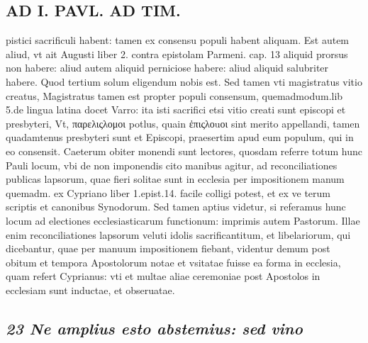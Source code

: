 \documentclass{article}
\begin{document}
\begin{pages}
\section*{AD I. PAVL. AD TIM. }
\marginpar{[ p.320 ]}\pstart pistici sacrificuli habent: tamen ex consensu populi habent aliquam. Est autem aliud, vt ait Augusti liber 2. contra epistolam Parmeni. cap. 13 aliquid prorsus non habere: aliud autem aliquid perniciose habere: aliud aliquid salubriter habere. Quod tertium solum eligendum nobis est. Sed tamen vti magistratus vitio creatus, Magistratus tamen est propter populi consensum, quemadmodum.lib 5.de lingua latina docet Varro: ita isti sacrifici etsi vitio creati sunt episcopi et presbyteri, Vt, παρελιςλομοι potlus, quain ἐπιςλοuοι sint merito appellandi, tamen quadamtenus presbyteri sunt et Episcopi, praesertim apud eum populum, qui in eo consensit.  \pend\pstart Caeterum obiter monendi sunt lectores, quosdam referre totum hunc Pauli locum, vbi de non imponendis cito manibus agitur, ad reconciliationes publicas lapsorum, quae fieri solitae sunt in ecclesia per impositionem manum quemadm. ex Cypriano liber 1.epist.14. facile colligi potest, et ex ve terum scriptis et canonibus Synodorum. Sed tamen aptius videtur, si referamus hunc locum ad electiones ecclesiasticarum functionum: imprimis autem Pastorum. Illae enim reconciliationes lapsorum veluti idolis sacrificantitum, et libelariorum, qui dicebantur, quae per manuum impositionem fiebant, videntur demum post obitum et tempora Apostolorum notae et vsitatae fuisse ea forma in ecclesia, quam refert Cyprianus: vti et multae aliae ceremoniae post Apostolos in ecclesiam sunt inductae, et obseruatae.  \pend
{}
{}
\subsection*{\textit{23 Ne amplius esto abstemius: sed vino }}

\end{pages}
\end{document}
